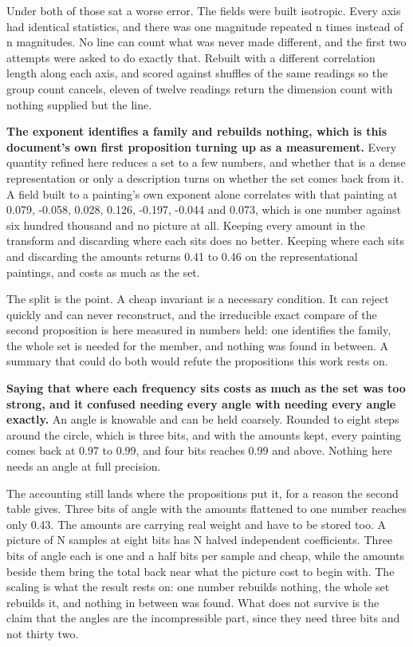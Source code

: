 Under both of those sat a worse error. The fields were built isotropic. Every axis had identical statistics, and there was one magnitude repeated n times instead of n magnitudes. No line can count what was never made different, and the first two attempts were asked to do exactly that. Rebuilt with a different correlation length along each axis, and scored against shuffles of the same readings so the group count cancels, eleven of twelve readings return the dimension count with nothing supplied but the line.

\textbf{The exponent identifies a family and rebuilds nothing, which is this document's own first proposition turning up as a measurement.} Every quantity refined here reduces a set to a few numbers, and whether that is a dense representation or only a description turns on whether the set comes back from it. A field built to a painting's own exponent alone correlates with that painting at 0.079, -0.058, 0.028, 0.126, -0.197, -0.044 and 0.073, which is one number against six hundred thousand and no picture at all. Keeping every amount in the transform and discarding where each sits does no better. Keeping where each sits and discarding the amounts returns 0.41 to 0.46 on the representational paintings, and costs as much as the set.

The split is the point. A cheap invariant is a necessary condition. It can reject quickly and can never reconstruct, and the irreducible exact compare of the second proposition is here measured in numbers held: one identifies the family, the whole set is needed for the member, and nothing was found in between. A summary that could do both would refute the propositions this work rests on.

\textbf{Saying that where each frequency sits costs as much as the set was too strong, and it confused needing every angle with needing every angle exactly.} An angle is knowable and can be held coarsely. Rounded to eight steps around the circle, which is three bits, and with the amounts kept, every painting comes back at 0.97 to 0.99, and four bits reaches 0.99 and above. Nothing here needs an angle at full precision.

The accounting still lands where the propositions put it, for a reason the second table gives. Three bits of angle with the amounts flattened to one number reaches only 0.43. The amounts are carrying real weight and have to be stored too. A picture of N samples at eight bits has N halved independent coefficients. Three bits of angle each is one and a half bits per sample and cheap, while the amounts beside them bring the total back near what the picture cost to begin with. The scaling is what the result rests on: one number rebuilds nothing, the whole set rebuilds it, and nothing in between was found. What does not survive is the claim that the angles are the incompressible part, since they need three bits and not thirty two.

